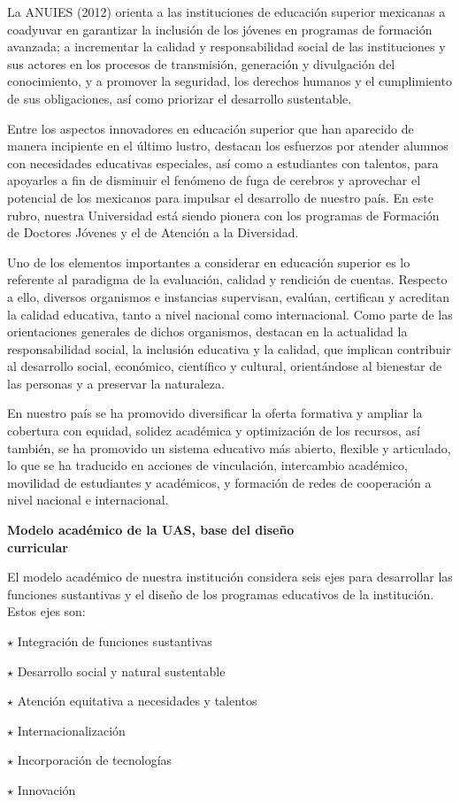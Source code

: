 \enlargethispage{1\baselineskip}
La ANUIES (2012) orienta a las
instituciones de educación superior mexicanas a coadyuvar en garantizar la
inclusión de los jóvenes en programas de formación avanzada; a incrementar la
calidad y responsabilidad social de las instituciones y sus actores en los
procesos de transmisión, generación y divulgación del conocimiento, y a 
promover  la seguridad, los derechos humanos y el cumplimiento de sus
obligaciones, así como priorizar el desarrollo sustentable.

Entre los aspectos innovadores en educación superior que han aparecido de
manera incipiente en el último lustro, destacan los esfuerzos  por atender
alumnos con necesidades educativas especiales, así como a estudiantes con
talentos, para apoyarles a fin de disminuir el fenómeno de fuga de cerebros
y aprovechar el potencial de los mexicanos para impulsar el desarrollo de
nuestro país. En este rubro, nuestra Universidad está siendo pionera con los
programas de Formación de Doctores Jóvenes y el de Atención a la
Diversidad.

Uno de los elementos importantes a considerar en educación superior es lo
referente al paradigma de la evaluación, calidad y rendición de cuentas.
Respecto a ello, diversos organismos e instancias supervisan,  evalúan,
certifican y acreditan la calidad educativa, tanto a nivel nacional como
internacional. Como parte de las orientaciones generales de dichos
organismos, destacan en la actualidad la responsabilidad social, la
inclusión educativa y la calidad, que implican contribuir al desarrollo
social, económico, científico y cultural, orientándose al bienestar de las
personas y a preservar la naturaleza.

En nuestro país se ha promovido diversificar la oferta formativa y ampliar
la cobertura con equidad, solidez académica y optimización de los recursos,
así también, se ha promovido un sistema educativo más abierto, flexible y
articulado, lo que se ha traducido en  acciones de
vinculación, intercambio académico, movilidad de estudiantes y académicos,
y formación de redes de cooperación  a nivel nacional e internacional.
\enlargethispage{2\baselineskip}

\textbf{Modelo académico de la UAS, base del diseño\\ curricular}

El modelo académico de nuestra institución considera seis ejes para
desarrollar las funciones sustantivas y el diseño de los programas
educativos de la institución. Estos ejes son:
\begin{Obs}
\item[$\star$] {Integración de funciones sustantivas}
\item[$\star$] {Desarrollo social y natural sustentable}
\item[$\star$] {Atención equitativa a necesidades y talentos}
\item[$\star$] {Internacionalización}
\item[$\star$] {Incorporación de tecnologías}
\item[$\star$] {Innovación}
\end{Obs}

